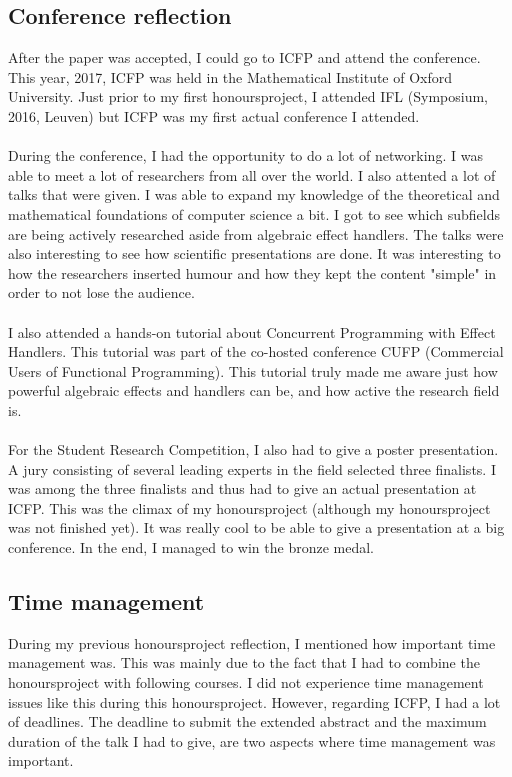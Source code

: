 \documentclass[notitlepage]{article}
\begin{document}
\subsection{Conference reflection}
After the paper was accepted, I could go to ICFP and attend the conference. This year, 2017, ICFP was held in the Mathematical Institute of Oxford University. Just prior to my first honoursproject, I attended IFL (Symposium, 2016, Leuven) but ICFP was my first actual conference I attended. \\
\\
During the conference, I had the opportunity to do a lot of networking. I was able to meet a lot of researchers from all over the world. I also attented a lot of talks that were given. I was able to expand my knowledge of the theoretical and mathematical foundations of computer science a bit. I got to see which subfields are being actively researched aside from algebraic effect handlers. The talks were also interesting to see how scientific presentations are done. It was interesting to how the researchers inserted humour and how they kept the content "simple" in order to not lose the audience. \\
\\
I also attended a hands-on tutorial about Concurrent Programming with Effect Handlers. This tutorial was part of the co-hosted conference CUFP (Commercial Users of Functional Programming). This tutorial truly made me aware just how powerful algebraic effects and handlers can be, and how active the research field is.\\
\\
For the Student Research Competition, I also had to give a poster presentation. A jury consisting of several leading experts in the field selected three finalists. I was among the three finalists and thus had to give an actual presentation at ICFP. This was the climax of my honoursproject (although my honoursproject was not finished yet). It was really cool to be able to give a presentation at a big conference. In the end, I managed to win the bronze medal.

\subsection{Time management}
During my previous honoursproject reflection, I mentioned how important time management was. This was mainly due to the fact that I had to combine the honoursproject with following courses. I did not experience time management issues like this during this honoursproject. However, regarding ICFP, I had a lot of deadlines. The deadline to submit the extended abstract and the maximum duration of the talk I had to give, are two aspects where time management was important.
\end{document}
